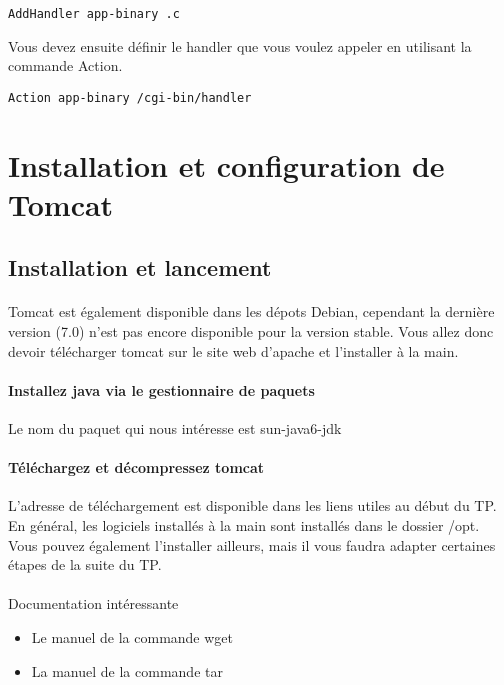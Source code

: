 \documentclass[12pt,a4paper]{article}
\begin{document}
\begin{lstlisting}
AddHandler app-binary .c 
\end{lstlisting}

Vous devez ensuite définir le handler que vous voulez appeler en utilisant la commande Action.

\begin{lstlisting}
Action app-binary /cgi-bin/handler
\end{lstlisting}

\section{Installation et configuration de Tomcat}

\subsection{Installation et lancement}

\paragraph{}
Tomcat est également disponible dans les dépots Debian, cependant la dernière version (7.0) n'est pas encore disponible pour la version stable. Vous allez donc devoir télécharger tomcat sur le site web d'apache et l'installer à la main.

\paragraph{Installez java via le gestionnaire de paquets\\}
Le nom du paquet qui nous intéresse est sun-java6-jdk

\paragraph{Téléchargez et décompressez tomcat\\}
L'adresse de téléchargement est disponible dans les liens utiles au début du TP. En général, les logiciels installés à la main sont installés dans le dossier /opt. Vous pouvez également l'installer ailleurs, mais il vous faudra adapter certaines étapes de la suite du TP.

\paragraph{}
Documentation intéressante
\begin{itemize}
\item Le manuel de la commande wget
\item La manuel de la commande tar
\end{itemize}
\end{document}
